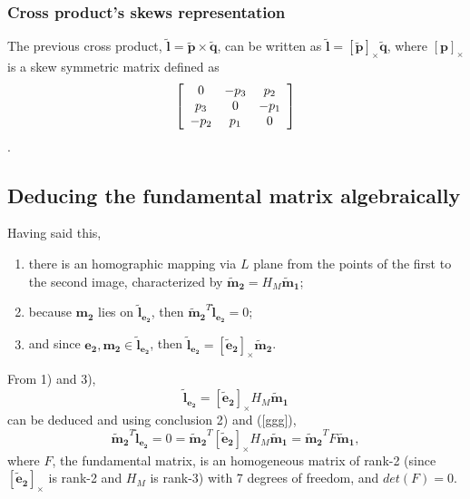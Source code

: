 \subsubsection{Cross product's \gls{skews} representation}
The previous cross product, $\mathbf{\tilde{l}} = \mathbf{\tilde{p}} \times \mathbf{\tilde{q}}$, can be written as $\mathbf{\tilde{l}} = [\mathbf{\tilde{p}}]_{\times} \mathbf{\tilde{q}}$, where $[\mathbf{p}]_{\times}$ is a skew symmetric matrix defined as
\begin{equation}
\left[ \begin{array} { c c c } { 0 } & { - p_ { 3 } } & { p_{ 2 } } \\ { p_{ 3 } } & { 0 } & { - p_{ 1 } } \\ { - p _ { 2 } } & { p_ { 1 } } & { 0 } \end{array} \right]
\end{equation}.

\subsection{Deducing the fundamental matrix algebraically}

Having said this,
\begin{enumerate}
	\item there is an homographic mapping via $L$ plane from the points of the first to the second image, characterized by $\mathbf{\tilde{m}_2} = H_M \mathbf{\tilde{m}_1}$;
	\item because $\mathbf{m_2}$ lies on $\mathbf{\tilde{l}_{e_2}}$, then $\mathbf{ \tilde{m}_2 } ^T \mathbf{\tilde{l}_{e_2}} = 0$;
	\item and since $\mathbf { e_2 }, \mathbf { m_2 } \in \mathbf{\tilde{l}_{e_2}}$, then $\mathbf{\tilde{l}_{e_2}} = [\mathbf{\tilde{e}_2}]_{\times} \mathbf{\tilde{m}_2}$.
\end{enumerate}
From 1) and 3), 
\begin{equation}
\label{ggg}
\mathbf{\tilde{l}_{e_2}} = [\mathbf{\tilde{e}_2}]_{\times} H_M \mathbf{\tilde{m}_1} 
\end{equation}
can be deduced and using conclusion 2) and (\ref{ggg}),
\begin{equation}
\label{sec2:eq:fundm}
\mathbf{\tilde{m}_2}^T \mathbf{\tilde{l}_{e_2}} = 0 = \mathbf{\tilde{m}_2}^T [\mathbf{\tilde{e}_2}]_{\times} H_M \mathbf{\tilde{m}_1}  = \mathbf{\tilde{m}_2}^T F \mathbf{\tilde{m}_1},
\end{equation}
where $F$, the fundamental matrix, is an homogeneous matrix of rank-2 (since $[\mathbf{\tilde{e}_2}]_{\times}$ is rank-2 and $H_M$ is rank-3) with 7 degrees of freedom, and $det(F) = 0$.

